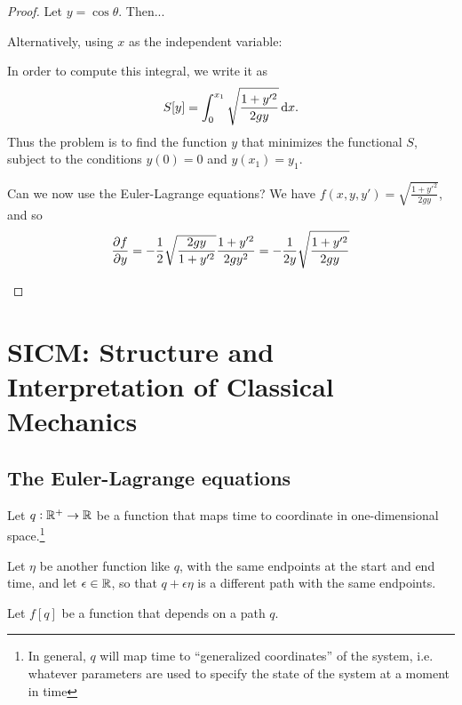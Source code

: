 \begin{proof}
  Let $y = \cos \theta$. Then...


  Alternatively, using $x$ as the independent variable:
  \begin{mdframed}
    In order to compute this integral, we write it as
    \begin{align*}
    S[y] = \int_{0}^{x_1} \sqrt{\frac{1 + y'^2}{2gy}}\dx.
  \end{align*}
  Thus the problem is to find the function $y$ that minimizes the functional $S$, subject to the conditions $y(0) = 0$ and $y(x_1) = y_1$.

  Can we now use the Euler-Lagrange equations? We have $f(x, y, y') = \sqrt{\frac{1 + y'^2}{2gy}}$, and so
  \begin{align*}
    \frac{\partial f}{\partial y} = -\frac{1}{2}\sqrt{\frac{2gy}{1 + y'^2}}\frac{1 + y'^2}{2gy^2} = -\frac{1}{2y}\sqrt{\frac{1 + y'^2}{2gy}}
  \end{align*}
\end{mdframed}

\end{proof}


\section{SICM: Structure and Interpretation of Classical Mechanics}

\subsection{The Euler-Lagrange equations}

Let $q:\mathbb{R}^+ \to \mathbb{R}$ be a function that maps time to coordinate in one-dimensional space.\footnote{In
  general, $q$ will map time to ``generalized coordinates'' of the system, i.e. whatever parameters
  are used to specify the state of the system at a moment in time}

Let $\eta$ be another function like $q$, with the same endpoints at the start and end time, and let $\epsilon \in \mathbb{R}$, so that $q + \epsilon\eta$ is a different path with
the same endpoints.


Let $f[q]$ be a function that depends on a path $q$.

